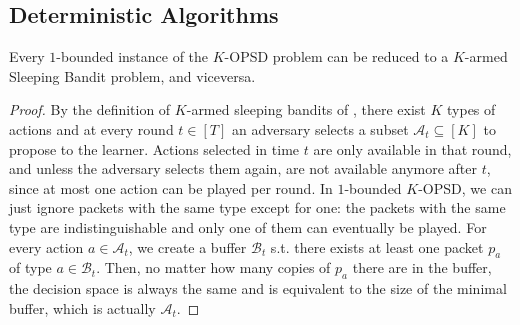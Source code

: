 \subsection{Deterministic Algorithms}
\begingroup
  \setcounter{lemma}{0}
  \renewcommand\thelemma{3.\arabic{lemma}}
\begin{lemma}
Every $1$-bounded instance of the $K$-OPSD problem can be reduced to a $K$-armed Sleeping Bandit problem, and viceversa.
\end{lemma}
\endgroup
\begin{proof}
    By the definition of $K$-armed sleeping bandits of \cite{kleinberg2010regret}, there exist $K$ types of actions and at every round $t \in [T]$ an adversary selects a subset $\mathcal{A}_t \subseteq [K]$ to propose to the learner. Actions selected in time $t$ are only available in that round, and unless the adversary selects them again, are not available anymore after $t$, since at most one action can be played per round. In $1$-bounded $K$-OPSD, we can just ignore packets with the same type except for one: the packets with the same type are indistinguishable and only one of them can eventually be played. For every action $a \in \mathcal{A}_t$, we create a buffer $\mathcal{B}_t$ s.t. there exists at least one packet $p_a$ of type $a \in \mathcal{B}_t$. Then, no matter how many copies of $p_a$ there are in the buffer, the decision space is always the same and is equivalent to the size of the minimal buffer, which is actually $\mathcal{A}_t$.
\end{proof}
\algedflearnBound*
